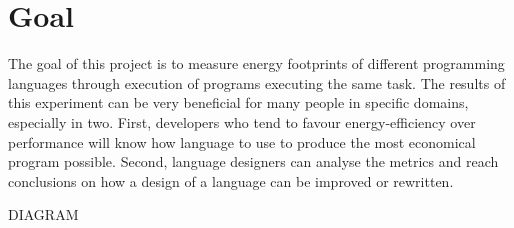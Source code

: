 \section{Goal}
\label{sec:Goal}
    The goal of this project is to measure energy footprints of different programming languages through execution of programs executing the same task. The results of this experiment can be very beneficial for many people in specific domains, especially in two. First, developers who tend to favour energy-efficiency over performance will know how language to use to produce the most economical program possible. Second, language designers can analyse the metrics and reach conclusions on how a design of a language can be improved or rewritten.
    
DIAGRAM